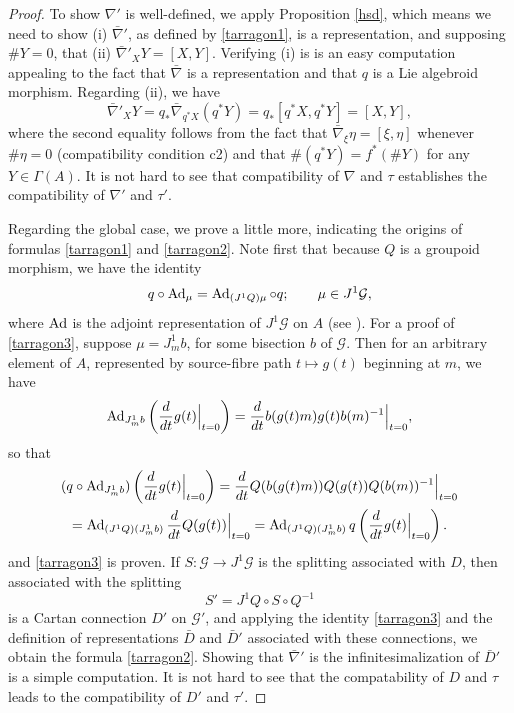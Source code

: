 \documentclass[leqno,12pt]{amsart} %
\begin{document}
\begin{proof}
  To show $\nabla'$ is well-defined, we apply Proposition \ref{hsd}, which means we need
  to show (i) $\bar\nabla'$, as defined by \eqref{tarragon1}, is a representation, and
  supposing $\#Y=0$, that (ii) $\bar\nabla'_XY = [X, Y]$. Verifying (i) is is an easy
  computation appealing to the fact that $\bar\nabla $ is a representation and that $q$ is
  a Lie algebroid morphism. Regarding (ii), we have
  \begin{equation*}
    \bar\nabla'_XY = q_*\bar\nabla_{q^*X}(q^*Y) = q_*[q^*X, q^*Y] = [X, Y],
  \end{equation*}
  where the second equality follows from the fact that
  $\bar\nabla_{\xi}{\eta} = [\xi, \eta]$ whenever $\# \eta =0$ (compatibility condition
  c2) and that $\# (q^*Y) = f^*(\# Y)$ for any $Y \in \Gamma(A)$. It is not hard to see
  that compatibility of $\nabla $ and $\tau $ establishes the compatibility of $\nabla'$
  and $\tau'$.

  Regarding the global case, we prove a little more, indicating the origins of formulas
  \eqref{tarragon1} and \eqref{tarragon2}. Note first that because $Q$ is a groupoid
  morphism, we have the identity
  \begin{equation}
    \label{tarragon3}
    q \circ \operatorname{Ad}_\mu = \operatorname{Ad}_{(J^1Q)\mu} \circ q; \qquad \mu \in J^1 {\mathcal G},
  \end{equation}
  where $\operatorname{Ad}$ is the adjoint representation of $J^1 {\mathcal G} $ on $A $
  (see \cite{Blaom_16b}). For a proof of \eqref{tarragon3}, suppose $\mu = J^1_mb$, for
  some bisection $b$ of $\mathcal G$. Then for an arbitrary element of $A$, represented by
  source-fibre path $t \mapsto g(t)$ beginning at $m$, we have
  \begin{equation*}
    \operatorname{Ad}_{J^1_m b}\left(\frac{d}{dt}g(t)\Big|_{t=0}\right)
    = \frac{d}{dt}b(g(t)m)g(t)b(m)^{-1}\Big|_{t=0},
  \end{equation*}
  so that
  \begin{multline*}
    (q \circ \operatorname{Ad}_{J^1_m b})\left(\frac{d}{dt}g(t)\Big|_{t=0}\right)
    = \frac{d}{dt}Q(b(g(t)m))Q(g(t))Q(b(m))^{-1}\Big|_{t=0}\\
    = \operatorname{Ad}_{(J^1Q)(J^1_m b)}  \frac{d}{dt}Q(g(t))\Big|_{t=0}
    = \operatorname{Ad}_{(J^1Q)(J^1_m b)}  q\left(\frac{d}{dt}g(t)\Big|_{t=0}\right).
  \end{multline*}
  and \eqref{tarragon3} is proven. If
  $S \colon {\mathcal G} \rightarrow J^1 {\mathcal G} $ is the splitting associated with
  $D$, then associated with the splitting
  \begin{equation}
    \label{tarragon4}
      S ' = J^1 Q \circ S \circ Q^{-1}
  \end{equation}
  is a Cartan connection $D'$ on ${\mathcal G}'$, and applying the identity
  \eqref{tarragon3} and the definition of representations $\bar D $ and $\bar D'$
  associated with these connections, we obtain the formula \eqref{tarragon2}. Showing that
  $\bar\nabla'$ is the infinitesimalization of $\bar D'$ is a simple computation. It is
  not hard to see that the compatability of $D$ and $\tau $ leads to the compatibility of
  $D'$ and $\tau'$.


\end{proof}
\end{document}
